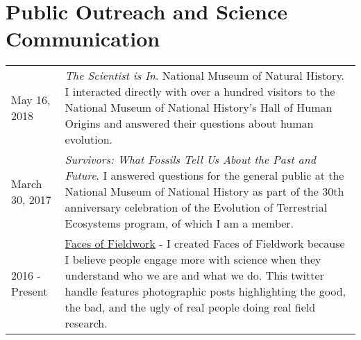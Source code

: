 \documentclass{article}
\begin{document}
\section*{Public Outreach and Science Communication}
\begin{longtable}{p{}p{}}
May 16, 2018 & \emph{The Scientist is In}. National Museum of Natural History. I interacted directly with over a hundred visitors to the National Museum of National History's Hall of Human Origins and answered their questions about human evolution.\\[4pt]
March 30, 2017 & \emph{Survivors: What Fossils Tell Us About the Past and Future}. I answered questions for the general public at the National Museum of National History as part of the 30th anniversary celebration of the Evolution of Terrestrial Ecosystems program, of which I am a member. \\[4pt]
2016 - Present & \href{https://twitter.com/facesfieldwork}{Faces of Fieldwork} - I created Faces of Fieldwork because I believe people engage more with science when they understand who we are and what we do. This twitter handle features photographic posts highlighting the good, the bad, and the ugly of real people doing real field research.\\[4pt]
\end{longtable}
\end{document}
